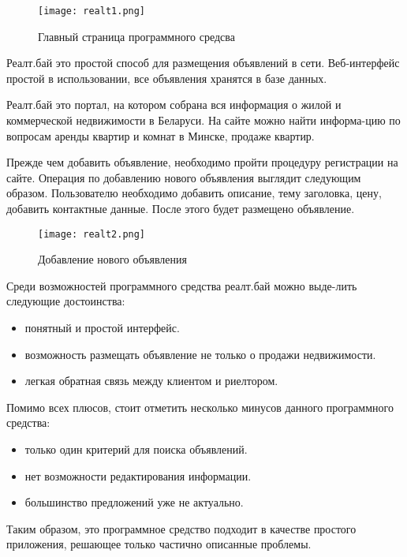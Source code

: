 \begin{figure}[!htb]
	\centering
	\texttt{[image: realt1.png]}
	\caption{ Главный страница программного средсва }
	\label{fig:arch_and_mod::realt1}
	\clearpage
\end{figure}

Реалт.бай это простой способ для размещения объявлений в сети. Веб-интерфейс простой в использовании, все объявления хранятся в базе данных.

Реалт.бай это портал, на котором собрана вся информация о жилой и коммерческой недвижимости в Беларуси. На сайте можно найти информа-цию по вопросам аренды квартир и комнат в Минске, продаже квартир.

Прежде чем добавить объявление, необходимо пройти процедуру регистрации на сайте. Операция по добавлению нового объявления выглядит следующим образом. Пользователю необходимо добавить описание, тему заголовка, цену,  добавить контактные данные. После этого будет размещено объявление.

\begin{figure}[!htb]
	\centering
	\texttt{[image: realt2.png]}
	\caption{ Добавление нового объявления }
	\label{fig:arch_and_mod::realt2}
	\clearpage
\end{figure}

Среди возможностей программного средства реалт.бай  можно выде-лить следующие достоинства:

\begin{itemize}
	\item понятный и простой интерфейс.
	\item возможность размещать объявление не только о продажи недвижимости.
	\item легкая обратная связь между клиентом и риелтором.
\end{itemize}

Помимо всех плюсов, стоит отметить несколько минусов данного программного средства:

\begin{itemize}
	\item только один критерий для поиска объявлений.
	\item нет возможности редактирования информации.
	\item большинство предложений уже не актуально.
\end{itemize}

Таким образом, это программное средство подходит в качестве простого приложения, решающее только частично описанные проблемы.

